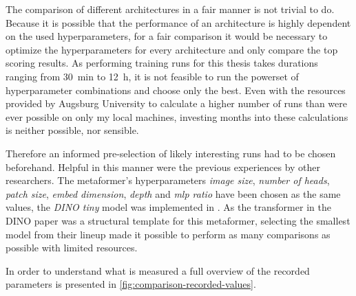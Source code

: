 The comparison of different architectures in a fair manner is not trivial to do.
Because it is possible that the performance of an architecture is highly dependent on the used hyperparameters, for a fair comparison it would be necessary to optimize the hyperparameters for every architecture and only compare the top scoring results.
As performing training runs for this thesis takes durations ranging from \SI[]{30}[]{\minute} to \SI[]{12}[]{\hour}, it is not feasible to run the powerset of hyperparameter combinations and choose only the best.
Even with the resources provided by Augsburg University to calculate a higher number of runs than were ever possible on only my local machines, investing months into these calculations is neither possible, nor sensible.

Therefore an informed pre-selection of likely interesting runs had to be chosen beforehand.
Helpful in this manner were the previous experiences by other researchers. 
The metaformer's hyperparameters \emph{image size}, \emph{number of heads}, \emph{patch size}, \emph{embed dimension}, \emph{depth} and \emph{mlp ratio} have been chosen as the same values, the \emph{DINO tiny} model was implemented in \cite{dinoGithub}. As the transformer in the DINO paper \cite{dinoPaper} was a structural template for this metaformer, selecting the smallest model from their lineup made it possible to perform as many comparisons as possible with limited resources.

In order to understand what is measured a full overview of the recorded parameters is presented in \autoref{fig:comparison-recorded-values}.

